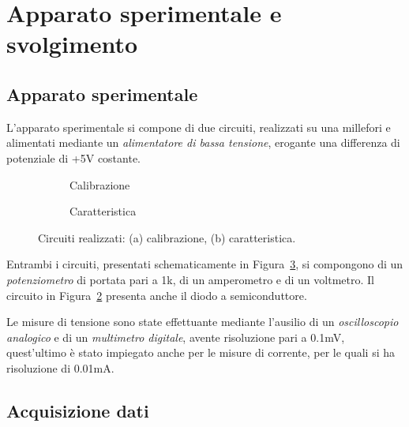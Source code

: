 \documentclass[@MAIN@]{subfiles}
\begin{document}
    \section{Apparato sperimentale e svolgimento} \label{sec:acquisizione}

    \subsection{Apparato sperimentale}\label{subsec:apparato-sperimentale}
    L'apparato sperimentale si compone di due circuiti, realizzati su una millefori
    e alimentati mediante un \textit{alimentatore di bassa tensione},
    erogante una differenza di potenziale di +5V costante.

    \begin{figure}[ht]
        \centering
        \begin{subfigure}[b]{0.4\textwidth}
            \centering
            
            \caption{Calibrazione}
            \label{fig:circuito-calibrazione}
        \end{subfigure}
        \hfill
        \begin{subfigure}[b]{0.55\textwidth}
            \centering
            
            \caption{Caratteristica}
            \label{fig:circuito-caratteristica}
        \end{subfigure}
        \caption{Circuiti realizzati: (a) calibrazione, (b) caratteristica.}
        \label{fig:figura_circuiti}
    \end{figure}

    \newpage
    Entrambi i circuiti, presentati schematicamente in Figura~\ref{fig:figura_circuiti}, si compongono di
    un \textit{potenziometro} di portata pari a 1k\textohm, di un amperometro e
    di un voltmetro.
    Il circuito in Figura~\ref{fig:circuito-caratteristica} presenta anche il diodo
    a semiconduttore.

    Le misure di tensione sono state effettuante mediante l'ausilio di un
    \textit{oscilloscopio analogico} e di un \textit{multimetro digitale}, avente
    risoluzione pari a 0.1mV, quest'ultimo è stato impiegato anche per le misure
    di corrente, per le quali si ha risoluzione di 0.01mA.
    \vspace{0.5pt}

    \subsection{Acquisizione dati}\label{subsec:acquisizione-dati}
\end{document}
